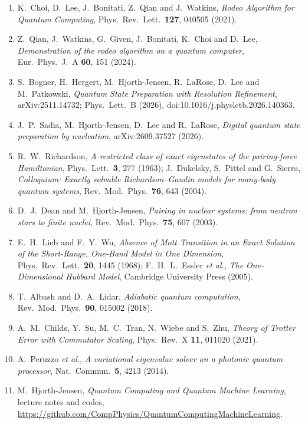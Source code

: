\documentclass[12pt,a4paper]{article}
\begin{document}
\begin{enumerate}
    \item K.~Choi, D.~Lee, J.~Bonitati, Z.~Qian and J.~Watkins, \textit{Rodeo Algorithm for Quantum Computing}, Phys.\ Rev.\ Lett.\ \textbf{127}, 040505 (2021).
    \item Z.~Qian, J.~Watkins, G.~Given, J.~Bonitati, K.~Choi and D.~Lee, \textit{Demonstration of the rodeo algorithm on a quantum computer}, Eur.\ Phys.\ J.\ A \textbf{60}, 151 (2024).
    \item S.~Bogner, H.~Hergert, M.~Hjorth-Jensen, R.~LaRose, D.~Lee and M.~Patkowski, \textit{Quantum State Preparation with Resolution Refinement}, arXiv:2511.14732; Phys.\ Lett.\ B (2026), doi:10.1016/j.physletb.2026.140363.
    \item J.~P.~Sadia, M.~Hjorth-Jensen, D.~Lee and R.~LaRose, \textit{Digital quantum state preparation by nucleation}, arXiv:2609.37527 (2026).
    \item R.~W.~Richardson, \textit{A restricted class of exact eigenstates of the pairing-force Hamiltonian}, Phys.\ Lett.\ \textbf{3}, 277 (1963); J.~Dukelsky, S.~Pittel and G.~Sierra, \textit{Colloquium: Exactly solvable Richardson--Gaudin models for many-body quantum systems}, Rev.\ Mod.\ Phys.\ \textbf{76}, 643 (2004).
    \item D.~J.~Dean and M.~Hjorth-Jensen, \textit{Pairing in nuclear systems: from neutron stars to finite nuclei}, Rev.\ Mod.\ Phys.\ \textbf{75}, 607 (2003).
    \item E.~H.~Lieb and F.~Y.~Wu, \textit{Absence of Mott Transition in an Exact Solution of the Short-Range, One-Band Model in One Dimension}, Phys.\ Rev.\ Lett.\ \textbf{20}, 1445 (1968); F.~H.~L.~Essler \textit{et al.}, \textit{The One-Dimensional Hubbard Model}, Cambridge University Press (2005).
    \item T.~Albash and D.~A.~Lidar, \textit{Adiabatic quantum computation}, Rev.\ Mod.\ Phys.\ \textbf{90}, 015002 (2018).
    \item A.~M.~Childs, Y.~Su, M.~C.~Tran, N.~Wiebe and S.~Zhu, \textit{Theory of Trotter Error with Commutator Scaling}, Phys.\ Rev.\ X \textbf{11}, 011020 (2021).
    \item A.~Peruzzo \textit{et al.}, \textit{A variational eigenvalue solver on a photonic quantum processor}, Nat.\ Commun.\ \textbf{5}, 4213 (2014).
    \item M.~Hjorth-Jensen, \textit{Quantum Computing and Quantum Machine Learning}, lecture notes and codes,\\ \url{https://github.com/CompPhysics/QuantumComputingMachineLearning}.
\end{enumerate}
\end{document}
